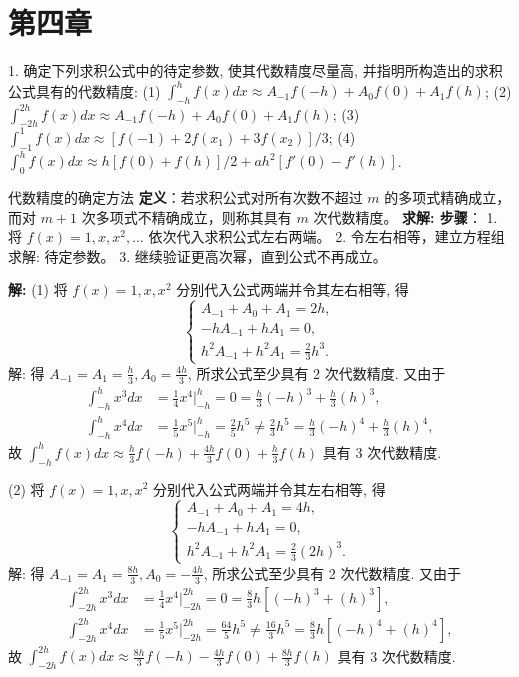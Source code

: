 \documentclass[a4paper,11pt]{ctexart}
\begin{document}
\newpage

\section{第四章}

1. 确定下列求积公式中的待定参数, 使其代数精度尽量高, 并指明所构造出的求积公式具有的代数精度:
(1) $\int_{-h}^h f(x)dx \approx A_{-1}f(-h) + A_0f(0) + A_1f(h)$;
(2) $\int_{-2h}^{2h} f(x)dx \approx A_{-1}f(-h) + A_0f(0) + A_1f(h)$;
(3) $\int_{-1}^1 f(x)dx \approx [f(-1) + 2f(x_1) + 3f(x_2)]/3$;
(4) $\int_0^h f(x)dx \approx h[f(0) + f(h)]/2 + ah^2[f'(0) - f'(h)]$.

\begin{theorybox}{代数精度的确定方法}
\textbf{定义}：若求积公式对所有次数不超过 $m$ 的多项式精确成立，而对 $m+1$ 次多项式不精确成立，则称其具有 $m$ 次代数精度。
\textbf{求解: 步骤}：
1. 将 $f(x) = 1, x, x^2, \dots$ 依次代入求积公式左右两端。
2. 令左右相等，建立方程组求解: 待定参数。
3. 继续验证更高次幂，直到公式不再成立。
\end{theorybox}

\textbf{解: } (1) 将 $f(x) = 1, x, x^2$ 分别代入公式两端并令其左右相等, 得
\[
\begin{cases}
A_{-1} + A_0 + A_1 = 2h, \\
-h A_{-1} + h A_1 = 0, \\
h^2 A_{-1} + h^2 A_1 = \frac{2}{3}h^3.
\end{cases}
\]
解: 得 $A_{-1} = A_1 = \frac{h}{3}, A_0 = \frac{4h}{3}$, 所求公式至少具有 2 次代数精度.
又由于
\begin{align*}
\int_{-h}^h x^3 dx &= \frac{1}{4}x^4 \Big|_{-h}^h = 0 = \frac{h}{3}(-h)^3 + \frac{h}{3}(h)^3, \\
\int_{-h}^h x^4 dx &= \frac{1}{5}x^5 \Big|_{-h}^h = \frac{2}{5}h^5 \neq \frac{2}{3}h^5 = \frac{h}{3}(-h)^4 + \frac{h}{3}(h)^4,
\end{align*}
故 $\int_{-h}^h f(x)dx \approx \frac{h}{3}f(-h) + \frac{4h}{3}f(0) + \frac{h}{3}f(h)$ 具有 3 次代数精度.

(2) 将 $f(x) = 1, x, x^2$ 分别代入公式两端并令其左右相等, 得
\[
\begin{cases}
A_{-1} + A_0 + A_1 = 4h, \\
-h A_{-1} + h A_1 = 0, \\
h^2 A_{-1} + h^2 A_1 = \frac{2}{3}(2h)^3.
\end{cases}
\]
解: 得 $A_{-1} = A_1 = \frac{8h}{3}, A_0 = -\frac{4h}{3}$, 所求公式至少具有 2 次代数精度.
又由于
\begin{align*}
\int_{-2h}^{2h} x^3 dx &= \frac{1}{4}x^4 \Big|_{-2h}^{2h} = 0 = \frac{8}{3}h[(-h)^3 + (h)^3], \\
\int_{-2h}^{2h} x^4 dx &= \frac{1}{5}x^5 \Big|_{-2h}^{2h} = \frac{64}{5}h^5 \neq \frac{16}{3}h^5 = \frac{8}{3}h[(-h)^4 + (h)^4],
\end{align*}
故 $\int_{-2h}^{2h} f(x)dx \approx \frac{8h}{3}f(-h) - \frac{4h}{3}f(0) + \frac{8h}{3}f(h)$ 具有 3 次代数精度.
\end{document}
